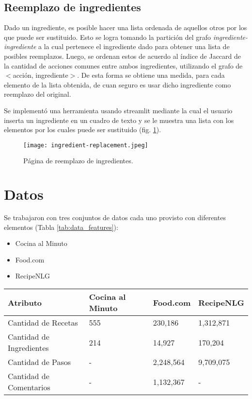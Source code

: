 \documentclass[
	a4paper, %
	10pt, %
	unnumberedsections, %
	twoside, %
]{LTJournalArticle}
\begin{document}
\subsection{Reemplazo de ingredientes}

Dado un ingrediente, es posible hacer una lista ordenada de aquellos otros por los que puede ser sustituido. Esto se logra tomando la partición del grafo \emph{ingrediente-ingrediente} a la cual pertenece el ingrediente dado para obtener una lista de posibles reemplazos. Luego, se ordenan estos de acuerdo al índice de Jaccard de la cantidad de acciones comunes entre ambos ingredientes, utilizando el grafo de $<$acción, ingrediente$>$. De esta forma se obtiene una medida, para cada elemento de la lista obtenida, de cuan seguro es usar dicho ingrediente como reemplazo del original. 

Se implementó una herramienta usando streamlit mediante la cual el usuario inserta un ingrediente en un cuadro de texto y se le muestra una lista con los elementos por los cuales puede ser sustituido (fig. \ref{fig:ingredient-replacement}).

\begin{figure}
	\texttt{[image: ingredient-replacement.jpeg]}
	\caption{Página de reemplazo de ingredientes.}
	\label{fig:ingredient-replacement}
\end{figure}

\section{Datos}

Se trabajaron con tres conjuntos de datos cada uno provisto con diferentes elementos (Tabla \ref{tab:data_features}):

\begin{itemize}
	\item Cocina al Minuto
	\item Food.com \autocite{majumder2019generating}
	\item RecipeNLG \autocite{bien-etal-2020-recipenlg}
\end{itemize}

\begin{table*} %
	\caption{Atributos de los conjuntos de datos.}
	\centering
	\begin{tabular}{l l l l}
		\toprule
		Atributo 				 & Cocina al Minuto & Food.com & RecipeNLG  \\
		\midrule
		Cantidad de Recetas 	 & 555				& 230,186	& 1,312,871	\\
		Cantidad de Ingredientes & 214	 			& 14,927	& 170,204	\\
		Cantidad de Pasos 		 & -	 			& 2,248,564	& 9,709,075	\\
		Cantidad de Comentarios  & -	 			& 1,132,367	& -			\\
		\bottomrule
	\end{tabular}
	\label{tab:data_features}
\end{table*}
\end{document}
